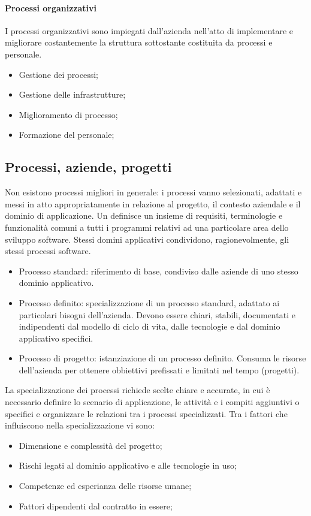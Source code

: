 \paragraph{Processi organizzativi}
I processi organizzativi sono impiegati dall'azienda nell'atto di implementare e migliorare costantemente la struttura sottostante costituita da processi e personale.

\begin{itemize}
	\item Gestione dei processi;
	\item Gestione delle infrastrutture;
	\item Miglioramento di processo;
	\item Formazione del personale;
\end{itemize}

\subsection{Processi, aziende, progetti}
Non esistono processi migliori in generale: i processi vanno selezionati, adattati e messi in atto appropriatamente in relazione al progetto, il contesto aziendale e il dominio di applicazione. Un  definisce un insieme di requisiti, terminologie e funzionalità comuni a tutti i programmi relativi ad una particolare area dello sviluppo software. Stessi domini applicativi condividono, ragionevolmente, gli stessi processi software.

\begin{itemize}
	\item Processo standard: riferimento di base, condiviso dalle aziende di uno stesso dominio applicativo.
	\item Processo definito: specializzazione di un processo standard, adattato ai particolari bisogni dell'azienda. Devono essere chiari, stabili, documentati e indipendenti dal modello di ciclo di vita, dalle tecnologie e dal dominio applicativo specifici.
	\item Processo di progetto: istanziazione di un processo definito. Consuma le risorse dell'azienda per ottenere obbiettivi prefissati e limitati nel tempo (progetti).
\end{itemize}

La specializzazione dei processi richiede scelte chiare e accurate, in cui è necessario definire lo scenario di applicazione, le attività e i compiti aggiuntivi o specifici e organizzare le relazioni tra i processi specializzati. Tra i fattori che influiscono nella specializzazione vi sono:
\begin{itemize}
	\item Dimensione e complessità del progetto;
	\item Rischi legati al dominio applicativo e alle tecnologie in uso;
	\item Competenze ed esperianza delle risorse umane;
	\item Fattori dipendenti dal contratto in essere;
\end{itemize}


